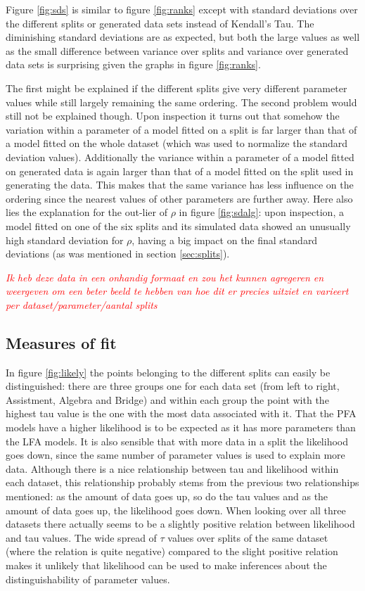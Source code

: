 \documentclass{scrartcl}
\newcommand\todo[1]{\textit{\textcolor{red}{#1}}}
\begin{document}
Figure \ref{fig:sds} is similar to figure \ref{fig:ranks} except with standard deviations over the different splits or generated data sets instead of Kendall's Tau. The diminishing standard deviations are as expected, but both the large values as well as the small difference between variance over splits and variance over generated data sets is surprising given the graphs in figure \ref{fig:ranks}. 

The first might be explained if the different splits give very different parameter values while still largely remaining the same ordering. The second problem would still not be explained though. Upon inspection it turns out that somehow the variation within a parameter of a model fitted on a split is far larger than that of a model fitted on the whole dataset (which was used to normalize the standard deviation values). Additionally the variance within a parameter of a model fitted on generated data is again larger than that of a model fitted on the split used in generating the data. This makes that the same variance has less influence on the ordering since the nearest values of other parameters are further away. Here also lies the explanation for the out-lier of $\rho$ in figure \ref{fig:sdalg}: upon inspection, a model fitted on one of the six splits and its simulated data showed an unusually high standard deviation for $\rho$, having a big impact on the final standard deviations (as was mentioned in section \ref{sec:splits}).

\todo{Ik heb deze data in een onhandig formaat en zou het kunnen agregeren en weergeven om een beter beeld te hebben van hoe dit er precies uitziet en varieert per dataset/parameter/aantal splits}

\subsection{Measures of fit}
In figure \ref{fig:likely} the points belonging to the different splits can easily be distinguished: there are three groups one for each data set (from left to right, Assistment, Algebra and Bridge) and within each group the point with the highest tau value is the one with the most data associated with it. That the PFA models have a higher likelihood is to be expected as it has more parameters than the LFA models. It is also sensible that with more data in a split the likelihood goes down, since the same number of parameter values is used to explain more data. Although there is a nice relationship between tau and likelihood within each dataset, this relationship probably stems from the previous two relationships mentioned: as the amount of data goes up, so do the tau values and as the amount of data goes up, the likelihood goes down. When looking over all three datasets there actually seems to be a slightly positive relation between likelihood and tau values. The wide spread of $\tau$ values over splits of the same dataset (where the relation is quite negative) compared to the slight positive relation makes it unlikely that likelihood can be used to make inferences about the distinguishability of parameter values.   
\end{document}
